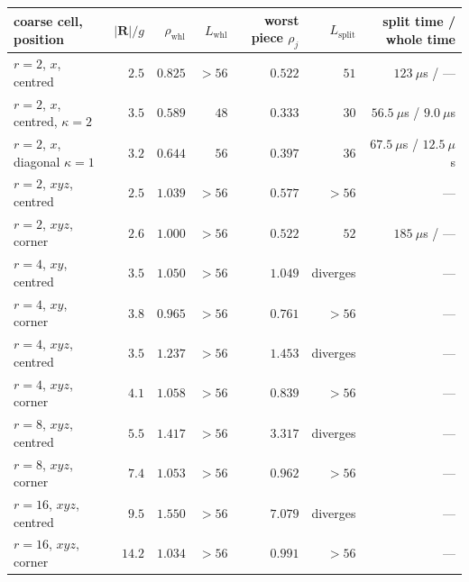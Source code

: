 \begin{center}\footnotesize
\begin{tabular}{@{}lrrrrrr@{}}
\toprule
coarse cell, position & $|\mathbf{R}|/g$ & $\rho_{\mathrm{whl}}$ & $L_{\mathrm{whl}}$ & worst piece $\rho_j$ & $L_{\mathrm{split}}$ & split time / whole time\\
\midrule
$r=2$, $x$, centred & $2.5$ & $0.825$ & $>56$ & $0.522$ & $51$ & $123~\mu$s / --- \\
$r=2$, $x$, centred, $\kappa=2$ & $3.5$ & $0.589$ & $48$ & $0.333$ & $30$ & $56.5~\mu$s / $9.0~\mu$s\\
$r=2$, $x$, diagonal $\kappa=1$ & $3.2$ & $0.644$ & $56$ & $0.397$ & $36$ & $67.5~\mu$s / $12.5~\mu$s\\
$r=2$, $xyz$, centred & $2.5$ & $1.039$ & $>56$ & $0.577$ & $>56$ & --- \\
$r=2$, $xyz$, corner & $2.6$ & $1.000$ & $>56$ & $0.522$ & $52$ & $185~\mu$s / ---\\
$r=4$, $xy$, centred & $3.5$ & $1.050$ & $>56$ & $1.049$ & diverges & --- \\
$r=4$, $xy$, corner & $3.8$ & $0.965$ & $>56$ & $0.761$ & $>56$ & --- \\
$r=4$, $xyz$, centred & $3.5$ & $1.237$ & $>56$ & $1.453$ & diverges & --- \\
$r=4$, $xyz$, corner & $4.1$ & $1.058$ & $>56$ & $0.839$ & $>56$ & --- \\
$r=8$, $xyz$, centred & $5.5$ & $1.417$ & $>56$ & $3.317$ & diverges & --- \\
$r=8$, $xyz$, corner & $7.4$ & $1.053$ & $>56$ & $0.962$ & $>56$ & --- \\
$r=16$, $xyz$, centred & $9.5$ & $1.550$ & $>56$ & $7.079$ & diverges & --- \\
$r=16$, $xyz$, corner & $14.2$ & $1.034$ & $>56$ & $0.991$ & $>56$ & --- \\
\bottomrule
\end{tabular}
\end{center}

